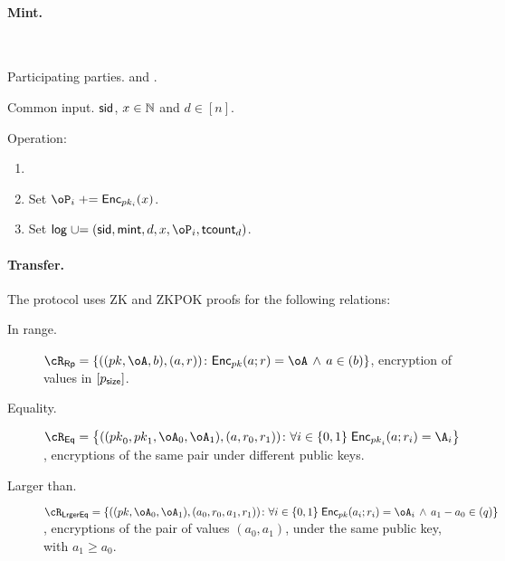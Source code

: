 \paragraph{Mint.}
\begin{protocol}~\label{prot:ConfidentialTransactions:Mint}
	\item[Participating parties.] \Mc and \Cc.
	
	
	
	\item[Common input.] $\mathsf{sid}$, $x\in {\mathbb{N}}$ and $d\in [n]$.
	
	\item[Operation:]  \Cc~
	
		\begin{enumerate}
			\item {}
			
			\item Set $\oP_i \pluseq \Enc_{pk_i}(x)$.
				
		\item Set $\historylog \unioneq (\sid,\mint,d,x,\oP_i,\tcount_d)$.
				 	
		
	\end{enumerate}
\end{protocol}

\paragraph{Transfer.}

The protocol uses ZK and ZKPOK proofs for the   following  relations:

\begin{description}
	\item[In range.] $\rRp =\rRpDef$, \ie  encryption of values in $[p_{\mathsf{size}}]$.
	
	\item[Equality.] $\rEq =\rEqDef$, \ie  encryptions of the same pair under different public keys.
	
	\item[Larger than.] $\rLrgEq =\rLrgEqDef$, \ie encryptions of the  pair of values $(a_0,a_1)$, under the same public key, with $a_1 \ge a_0$.
\end{description}




